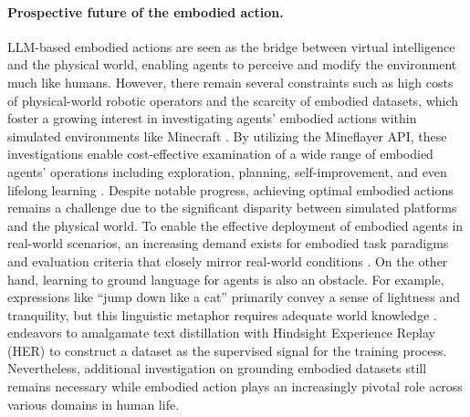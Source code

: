 \paragraph{Prospective future of the embodied action.} 
LLM-based embodied actions are seen as the bridge between virtual intelligence and the physical world, enabling agents to perceive and modify the environment much like humans. However, there remain several constraints such as high costs of physical-world robotic operators and the scarcity of embodied datasets, which foster a growing interest in investigating agents' embodied actions within simulated environments like Minecraft \cite{DBLP:journals/corr/abs-2302-01560, DBLP:journals/corr/abs-2106-14876, DBLP:conf/nips/FanWJMYZTHZA22, DBLP:journals/corr/abs-2305-16291, DBLP:conf/icml/NottinghamAS0H023}. By utilizing the Mineflayer \cite{Mineflayer-JavaScript-2013} API, these investigations enable cost-effective examination of a wide range of embodied agents' operations including exploration, planning, self-improvement, and even lifelong learning \cite{DBLP:journals/corr/abs-2305-16291}. Despite notable progress, achieving optimal embodied actions remains a challenge due to the significant disparity between simulated platforms and the physical world. To enable the effective deployment of embodied agents in real-world scenarios, an increasing demand exists for embodied task paradigms and evaluation criteria that closely mirror real-world conditions \cite{DBLP:journals/tetci/DuanYTZT22}. On the other hand, learning to ground language for agents is also an obstacle. For example, expressions like ``jump down like a cat'' primarily convey a sense of lightness and tranquility, but this linguistic metaphor requires adequate world knowledge \cite{DBLP:conf/emnlp/BiskHTABCLLMNPT20}. \cite{DBLP:conf/icml/SumersMAF023} endeavors to amalgamate text distillation with Hindsight Experience Replay (HER) to construct a dataset as the supervised signal for the training process. Nevertheless, additional investigation on grounding embodied datasets still remains necessary while embodied action plays an increasingly pivotal role across various domains in human life.



